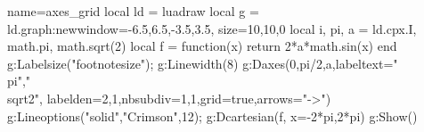 \begin{luadraw}{name=axes_grid}
local ld = luadraw
local g = ld.graph:new{window={-6.5,6.5,-3.5,3.5}, size={10,10,0}}
local i, pi, a = ld.cpx.I, math.pi, math.sqrt(2)
local f = function(x) return 2*a*math.sin(x) end
g:Labelsize("footnotesize"); g:Linewidth(8)
g:Daxes({0,pi/2,a},{labeltext={"\\pi","\\sqrt{2}"}, labelden={2,1},nbsubdiv={1,1},grid=true,arrows="->"})
g:Lineoptions("solid","Crimson",12); g:Dcartesian(f, {x={-2*pi,2*pi}})
g:Show()
\end{luadraw}
